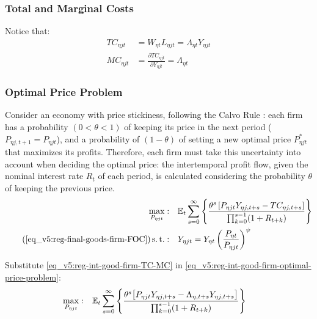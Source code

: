 \documentclass[../thesis.tex]{subfiles}
\begin{document}
\subsubsection*{Total and Marginal Costs}

Notice that:
\begin{align}
	TC_{\eta jt} &= W_{\eta t} L_{\eta jt} = \Lambda_{\eta t} Y_{\eta jt} \label{eq_v5:reg-int-good-firm-TC-MC} \\
	MC_{\eta jt} &= \frac{\partial TC_{\eta jt}}{\partial Y_{\eta jt}} = \Lambda_{\eta t} \nonumber
\end{align}



\subsubsection*{Optimal Price Problem}

Consider an economy with price stickiness, following the Calvo Rule \cite{calvo_staggered_1983}: each firm has a probability $(0 < \theta < 1)$ of keeping its price in the next period ($P_{\eta j,t+1} = P_{\eta jt}$), and a probability of $(1 - \theta)$ of setting a new optimal price $P_{\eta jt}^{\ast}$ that maximizes its profits. Therefore, each firm must take this uncertainty into account when deciding the optimal price: the intertemporal profit flow, given the nominal interest rate $R_{t}$ of each period, is calculated considering the probability $\theta$ of keeping the previous price. 
\begin{align}
	\label{eq_v5:reg-int-good-firm-optimal-price-problem}
	\max_{P_{\eta jt}}: & \quad \E \sum_{s=0}^{\infty} \left\{ \frac{ \theta^s \left[ P_{\eta jt} Y_{\eta j,t+s} - TC_{\eta j,t+s} \right]}{\prod_{k=0}^{s-1}(1+R_{t+k})} \right\} \\
	\tag{\ref{eq_v5:reg-final-goods-firm-FOC}}
	\st: & \quad Y_{\eta jt} = Y_{\eta t} \left( \frac{P_{\eta t}}{P_{\eta jt}} \right)^{\psi}
\end{align}


Substitute \ref{eq_v5:reg-int-good-firm-TC-MC} in \ref{eq_v5:reg-int-good-firm-optimal-price-problem}:
\begin{align}
	\label{eq_v5:reg-int-good-firm-optimal-price-problem-2}
	\max_{P_{\eta jt}}: & \quad {\mathbb{E}_{t}} \sum_{s=0}^{\infty} \left\{ \frac{\theta^s \big[ P_{\eta jt} Y_{\eta j,t+s} - \Lambda_{\eta, t+s} Y_{\eta j,t+s} \big]}{\prod_{k=0}^{s-1}(1+R_{t+k})} \right\}
\end{align}
\end{document}
